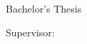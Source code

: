 \begin{titlepage}
    \begin{center}
        \vspace*{1cm}

        \Huge
        \textbf{\myTitle}

        \vspace{1cm}
        \LARGE

        \textbf{\myName \mySurname}

        \vfill

        Bachelor's Thesis

        \Large

        Supervisor: \myTutor

        \vspace{1.8cm}

        \textbf{\myUniversity}\\
        \myDepartament\\
        \myLocation \currentYear

    \end{center}

\end{titlepage}
